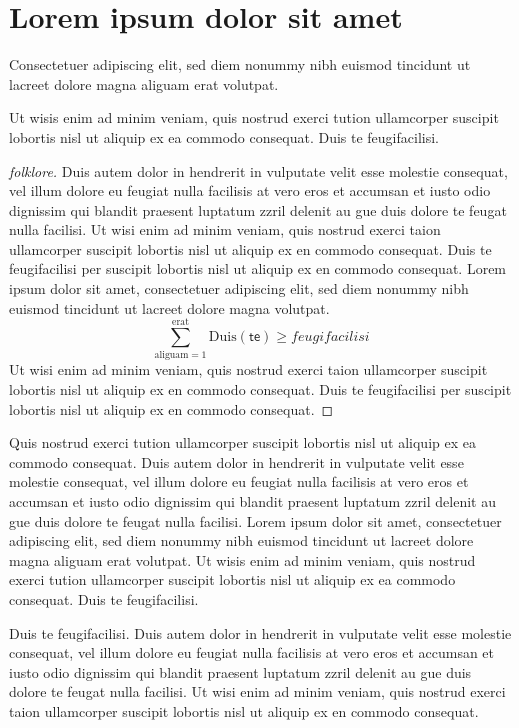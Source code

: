 \documentclass[11pt]{report}
\begin{document}
\section{Lorem ipsum dolor sit amet}

Consectetuer adipiscing elit, sed diem nonummy nibh euismod tincidunt
ut lacreet dolore magna aliguam erat volutpat. 

\begin{theorem}
Ut wisis enim ad minim veniam, quis nostrud exerci tution
ullamcorper suscipit lobortis nisl ut aliquip ex ea commodo consequat. 
Duis te feugifacilisi. 
\end{theorem}

\begin{proof}[folklore]
Duis autem dolor in hendrerit in vulputate velit esse molestie
consequat, vel illum dolore eu feugiat nulla facilisis at vero eros et
accumsan et iusto odio dignissim qui blandit praesent luptatum zzril
delenit au gue duis dolore te feugat nulla facilisi.  Ut wisi enim ad
minim veniam, quis nostrud exerci taion ullamcorper suscipit lobortis
nisl ut aliquip ex en commodo consequat.  Duis te feugifacilisi per
suscipit lobortis nisl ut aliquip ex en commodo consequat.  Lorem
ipsum dolor sit amet, consectetuer adipiscing elit, sed diem nonummy
nibh euismod tincidunt ut lacreet dolore magna
volutpat. 
\begin{equation}
\sum_{\text{aliguam}=1}^{\text{erat}}
	\mathrm{Duis}(\mathsf{te}) \ge \mathit{feugifacilisi}
\end{equation}
Ut wisi enim ad minim veniam, quis nostrud exerci taion ullamcorper
suscipit lobortis nisl ut aliquip ex en commodo consequat.  Duis te
feugifacilisi per suscipit lobortis nisl ut aliquip ex en commodo
consequat. 
\end{proof}

Quis nostrud exerci tution ullamcorper suscipit lobortis nisl ut
aliquip ex ea commodo consequat.  Duis autem dolor in hendrerit in
vulputate velit esse molestie consequat, vel illum dolore eu feugiat
nulla facilisis at vero eros et accumsan et iusto odio dignissim qui
blandit praesent luptatum zzril delenit au gue duis dolore te feugat
nulla facilisi.  Lorem ipsum dolor sit amet, consectetuer adipiscing
elit, sed diem nonummy nibh euismod tincidunt ut lacreet dolore magna
aliguam erat volutpat.  Ut wisis enim ad minim veniam, quis nostrud
exerci tution ullamcorper suscipit lobortis nisl ut aliquip ex ea
commodo consequat.  Duis te feugifacilisi. 

\begin{ddanger}
Duis te feugifacilisi.  Duis autem dolor in hendrerit in vulputate
velit esse molestie consequat, vel illum dolore eu feugiat nulla
facilisis at vero eros et accumsan et iusto odio dignissim qui blandit
praesent luptatum zzril delenit au gue duis dolore te feugat nulla
facilisi.  Ut wisi enim ad minim veniam, quis nostrud exerci taion
ullamcorper suscipit lobortis nisl ut aliquip ex en commodo
consequat.  
\end{ddanger}
\end{document}
